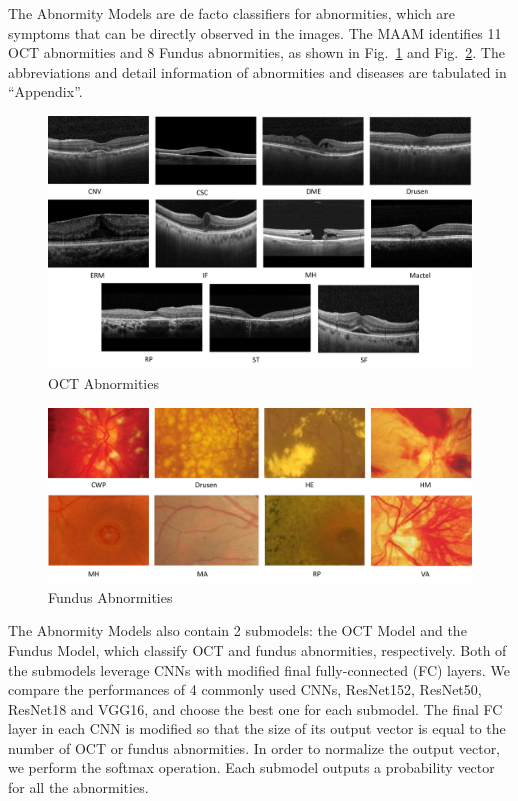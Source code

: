 \documentclass{article}
\begin{document}
	The Abnormity Models are de facto classifiers for abnormities, which are symptoms that can be directly observed in the images. The MAAM identifies 11 OCT abnormities and 8 Fundus abnormities, as shown in Fig.~\ref{fig:OCT_abnormities} and Fig.~\ref{fig:fundus_abnormities}. The abbreviations and detail information of abnormities and diseases are tabulated in ``Appendix''.
	
	\begin{figure}[htbp]
		\centering
		\includegraphics[width=\linewidth]{Figs/OCT_Abnormities.pdf}
		\caption{OCT Abnormities}
		\vspace{0.3cm}
		\label{fig:OCT_abnormities}
	\end{figure}
	
	\begin{figure}[htbp]
		\centering
		\includegraphics[width=\linewidth]{Figs/fundus_Abnormities.pdf}
		\caption{Fundus Abnormities}
		\vspace{0.3cm}
		\label{fig:fundus_abnormities}
	\end{figure}
	
	The Abnormity Models also contain 2 submodels: the OCT Model and the Fundus Model, which classify OCT and fundus abnormities, respectively. Both of the submodels leverage CNNs with modified final fully-connected (FC) layers. We compare the performances of 4 commonly used CNNs, ResNet152, ResNet50, ResNet18 and VGG16, and choose the best one for each submodel. The final FC layer in each CNN is modified so that the size of its output vector is equal to the number of OCT or fundus abnormities. In order to normalize the output vector, we perform the softmax operation. Each submodel outputs a probability vector for all the abnormities.
	
\end{document}
